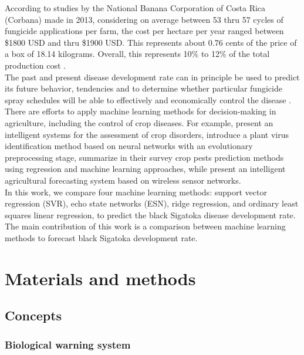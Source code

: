 \documentclass[review]{elsarticle}
\begin{document}
According to studies by the National Banana Corporation of Costa Rica (Corbana) made in 2013, considering on average between 53 thru 57 cycles of fungicide applications per farm, the cost per hectare per year ranged between \$1800 USD and thru \$1900 USD. This represents about 0.76 cents of the price of a box of 18.14 kilograms. Overall, this represents 10\% to 12\% of the total production cost \citet{Bresciani2015}.\\
The past and present disease development rate can in principle be used to predict its future behavior, tendencies and to determine whether particular fungicide spray schedules will be able to effectively and economically control the disease \citet{ChuangJeger1987}.\\
There are efforts to apply machine learning methods for decision-making in agriculture, including the control of crop diseases. For example, \cite{Camargo2012} present an intelligent systems for the assessment of crop disorders, \cite{Huang2010} introduce a plant virus identification method based on neural networks with an evolutionary preprocessing stage, \cite{Kim2014} summarize in their survey crop pests prediction methods using regression and machine learning approaches, while \cite{Zhao2013} present an intelligent agricultural forecasting system based on wireless sensor networks.\\
In this work, we compare four machine learning methods: support vector regression (SVR), echo state networks (ESN), ridge regression, and ordinary least squares linear regression, to predict the black Sigatoka disease development rate.\\
The main contribution of this work is a comparison between machine learning methods to forecast black Sigatoka development rate.\\

\section{Materials and methods}

\subsection{Concepts}

\subsubsection{Biological warning system}
\end{document}
